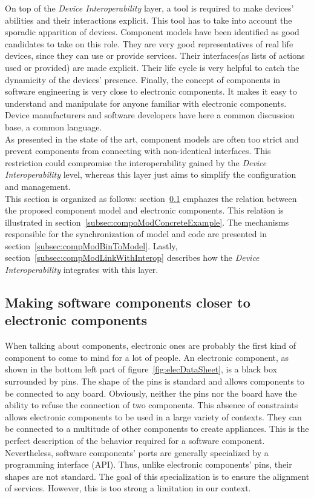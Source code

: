 On top of the {\it Device Interoperability} layer, a tool is required to make devices' abilities and their interactions explicit. This tool has to take into account the sporadic apparition of devices. Component models have been identified as good candidates to take on this role. They are very good representatives of real life devices, since they can use or provide services. Their interfaces(as lists of actions used or provided) are made explicit. Their life cycle is very helpful to catch the dynamicity of the devices' presence. Finally, the concept of components in software engineering is very close to electronic components. It makes it easy to understand and manipulate for anyone familiar with electronic components. Device manufacturers and software developers have here a common discussion base, a common language.\\
As presented in the state of the art, component models are often too strict and prevent components from connecting with non-identical interfaces. This restriction could compromise the interoperability gained by the {\it Device Interoperability} level, whereas this layer just aims to simplify the configuration and management.\\

This section is organized as follows: section~\ref{subsec:makeSoftCloserToElec} emphazes the relation between the proposed component model and electronic components. This relation is illustrated in section~\ref{subsec:compoModConcreteExample}. The mechanisms responsible for the synchronization of model and code are presented in section~\ref{subsec:compModBinToModel}. Lastly, section~\ref{subsec:compModLinkWithInterop} describes how the {\it Device Interoperability} integrates with this layer.


\subsection{Making software components closer to electronic components}
\label{subsec:makeSoftCloserToElec}

When talking about components, electronic ones are probably the first kind of component to come to mind for a lot of people. An electronic component, as shown in the bottom left part of figure~\ref{fig:elecDataSheet}, is a black box surrounded by pins. The shape of the pins is standard and allows components to be connected to any board. Obviously, neither the pins nor the board have the ability to refuse the connection of two components. This absence of constraints allows electronic components to be used in a large variety of contexts. They can be connected to a multitude of other components to create appliances. This is the perfect description of the behavior required for a software component.\\
Nevertheless, software components' ports are generally specialized by a programming interface (API). Thus, unlike electronic components' pins, their shapes are not standard. The goal of this specialization is to ensure the alignment of services. However, this is too strong a limitation in our context.\\

